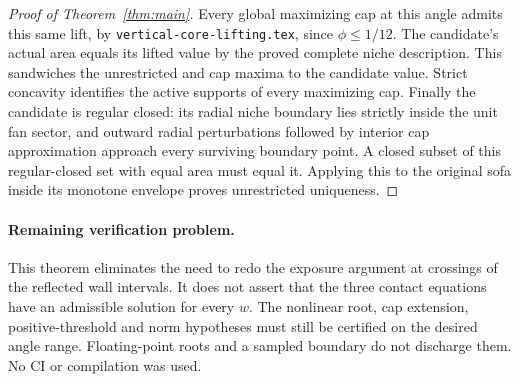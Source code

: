\documentclass[11pt]{article}
\begin{document}
\begin{proof}[Proof of Theorem~\ref{thm:main}]
Every global maximizing cap at this angle admits this same lift, by \texttt{vertical-core-lifting.tex}, since $\phi\le1/12$. The candidate's actual area equals its lifted value by the proved complete niche description. This sandwiches the unrestricted and cap maxima to the candidate value. Strict concavity identifies the active supports of every maximizing cap. Finally the candidate is regular closed: its radial niche boundary lies strictly inside the unit fan sector, and outward radial perturbations followed by interior cap approximation approach every surviving boundary point. A closed subset of this regular-closed set with equal area must equal it. Applying this to the original sofa inside its monotone envelope proves unrestricted uniqueness.
\end{proof}

\paragraph{Remaining verification problem.}
This theorem eliminates the need to redo the exposure argument at crossings of the reflected wall intervals. It does not assert that the three contact equations have an admissible solution for every $w$. The nonlinear root, cap extension, positive-threshold and norm hypotheses must still be certified on the desired angle range. Floating-point roots and a sampled boundary do not discharge them. No CI or compilation was used.
\end{document}
